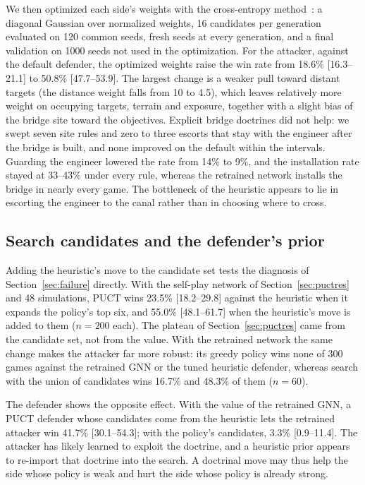 \documentclass{article}
\begin{document}
We then optimized each side's weights with the cross-entropy method~\cite{cem}: a
diagonal Gaussian over normalized weights, 16 candidates per generation evaluated on 120
common seeds, fresh seeds at every generation, and a final validation on 1000 seeds not
used in the optimization. For the attacker, against the default defender, the optimized
weights raise the win rate from 18.6\% [16.3--21.1] to 50.8\% [47.7--53.9]. The largest
change is a weaker pull toward distant targets (the distance weight falls from 10 to 4.5),
which leaves relatively more weight on occupying targets, terrain and exposure, together
with a slight bias of the bridge site toward the objectives. Explicit bridge doctrines
did not help: we swept seven site rules and zero to three escorts that stay with the
engineer after the bridge is built, and none improved on the default within the
intervals. Guarding the engineer lowered the rate from 14\% to 9\%, and the installation
rate stayed at 33--43\% under every rule, whereas the retrained network installs the
bridge in nearly every game. The bottleneck of the heuristic appears to lie in escorting
the engineer to the canal rather than in choosing where to cross.

\subsection{Search candidates and the defender's prior}
\label{sec:cands}
Adding the heuristic's move to the candidate set tests the diagnosis of
Section~\ref{sec:failure} directly. With the self-play network of
Section~\ref{sec:puctres} and 48 simulations, PUCT wins 23.5\% [18.2--29.8] against the
heuristic when it expands the policy's top six, and 55.0\% [48.1--61.7] when the
heuristic's move is added to them ($n=200$ each). The plateau of
Section~\ref{sec:puctres} came from the candidate set, not from the value. With the
retrained network the same change makes the attacker far more robust: its greedy policy
wins none of 300 games against the retrained GNN or the tuned heuristic defender, whereas
search with the union of candidates wins 16.7\% and 48.3\% of them ($n=60$).

The defender shows the opposite effect. With the value of the retrained GNN, a PUCT
defender whose candidates come from the heuristic lets the retrained attacker win 41.7\%
[30.1--54.3]; with the policy's candidates, 3.3\% [0.9--11.4]. The attacker has likely
learned to exploit the doctrine, and a heuristic prior appears to re-import that
doctrine into the search. A doctrinal move may thus help the side whose policy is weak
and hurt the side whose policy is already strong.
\end{document}
